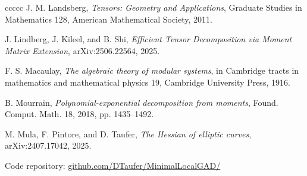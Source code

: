 \documentclass{amsart}
\theoremstyle{plain}
\numberwithin{equation}{section}
\begin{document}
\begin{thebibliography}{ccccc}
 J. M. Landsberg, 
\emph{Tensors: Geometry and Applications},
Graduate Studies in Mathematics 128, American Mathematical Society, 2011.

 J. Lindberg, J. Kileel, and B. Shi, 
\emph{Efficient Tensor Decomposition via Moment Matrix Extension},
arXiv:2506.22564, 2025.

 F. S. Macaulay,
\emph{The algebraic theory of modular systems},
in Cambridge tracts in mathematics and mathematical physics 19, Cambridge University Press, 1916. 

 B. Mourrain,
\emph{Polynomial-exponential decomposition from moments},
Found. Comput. Math. 18, 2018, pp. 1435–1492.

 M. Mula, F. Pintore, and D. Taufer,
\emph{The Hessian of elliptic curves},
arXiv:2407.17042, 2025.


 Code repository: \href{https://github.com/DTaufer/MinimalLocalGAD/}{github.com/DTaufer/MinimalLocalGAD/}
\end{thebibliography}


%
%
\end{document}

